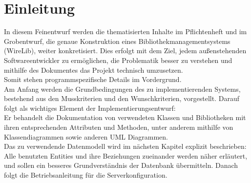 \chapter{Einleitung}

In diesem Feinentwurf werden die thematisierten Inhalte im Pflichtenheft und im Grobentwurf, die genaue Konstruktion eines Bibliothekmanagementsystems (WireLib), weiter konkretisiert. 
Dies erfolgt mit dem Ziel, jedem außenstehenden Softwareentwickler zu ermöglichen, die Problematik besser zu verstehen und mithilfe des Dokumentes das Projekt technisch umzusetzen.\\
Somit stehen programmspezifische Details im Vordergrund. \\
Am Anfang werden die Grundbedingungen des zu implementierenden Systems, bestehend aus den Musskriterien und den Wunschkriterien, vorgestellt.
Darauf folgt als wichtiges Element der Implementierungsentwurf: \\
Er behandelt die Dokumentation von verwendeten Klassen und Bibliotheken mit ihren entsprechenden Attributen und Methoden, unter anderem mithilfe von Klassendiagrammen sowie anderen UML Diagrammen.\\ 
Das zu verwendende Datenmodell wird im nächsten Kapitel explizit beschrieben: \\
Alle benutzten Entities und ihre Beziehungen zueinander werden näher erläutert, und sollen ein besseres Grundverständnis der Datenbank übermitteln.
Danach folgt die Betriebsanleitung für die Serverkonfiguration.    
